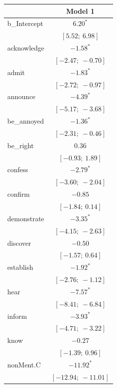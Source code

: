 \documentclass[11pt,fleqn]{article}
\newcommand{\6}{\mbox{$[\hspace*{-.6mm}[$}}
\newcommand{\9}{\mbox{$]\hspace*{-.6mm}]$}}
\begin{document}
{\begin{table}
\begin{center}
\begin{tabular}{l c }
\hline
 & Model 1 \\
\hline
b\_Intercept       & $6.20^{*}$          \\
                   & $[5.52;\ 6.98]$     \\
acknowledge & $-1.58^{*}$         \\
                   & $[-2.47;\ -0.70]$   \\
admit       & $-1.83^{*}$         \\
                   & $[-2.72;\ -0.97]$   \\
announce    & $-4.39^{*}$         \\
                   & $[-5.17;\ -3.68]$   \\
be\_annoyed & $-1.36^{*}$         \\
                   & $[-2.31;\ -0.46]$   \\
be\_right   & $0.36$              \\
                   & $[-0.93;\ 1.89]$    \\
confess     & $-2.79^{*}$         \\
                   & $[-3.60;\ -2.04]$   \\
confirm     & $-0.85$             \\
                   & $[-1.84;\ 0.14]$    \\
demonstrate & $-3.35^{*}$         \\
                   & $[-4.15;\ -2.63]$   \\
discover    & $-0.50$             \\
                   & $[-1.57;\ 0.64]$    \\
establish   & $-1.92^{*}$         \\
                   & $[-2.76;\ -1.12]$   \\
hear        & $-7.57^{*}$         \\
                   & $[-8.41;\ -6.84]$   \\
inform      & $-3.93^{*}$         \\
                   & $[-4.71;\ -3.22]$   \\
know        & $-0.27$             \\
                   & $[-1.39;\ 0.96]$    \\
nonMent.C   & $-11.92^{*}$        \\
                   & $[-12.94;\ -11.01]$ \\

\end{tabular}
\end{center}
\end{table}}
\end{document}
